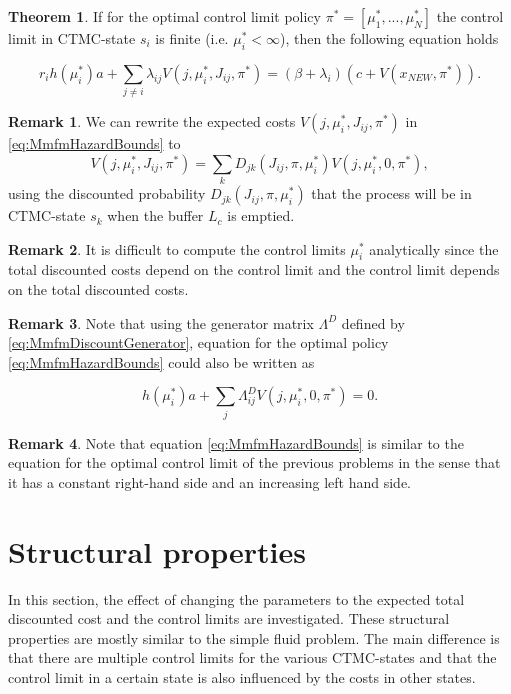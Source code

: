 \documentclass[a4paper]{thesis}
\theoremstyle{definition}
\newtheorem{remark}{Remark}[chapter]
\newtheorem{theorem}{Theorem}[chapter] %
\providecommand{\DIFaddbegin}{} %
\providecommand{\DIFaddend}{} %
\newcommand{\DIFaddincludegraphics}[2][]{{\color{blue}\fbox{\DIFOincludegraphics[#1]{#2}}}} %
\DeclareRobustCommand{\DIFaddbegin}{\DIFOaddbegin \let\includegraphics\DIFaddincludegraphics} %
\DeclareRobustCommand{\DIFaddend}{\DIFOaddend \let\includegraphics\DIFOincludegraphics} %
\begin{document}
	\begin{theorem}
		If for the optimal control limit policy $\pi^*=[\mu_1^*,...,\mu_N^*]$ the control limit in CTMC-state $s_i$ is finite (i.e. $\mu_i^*<\infty$), then the following equation holds 
		
		\begin{equation}\label{eq:MmfmHazardBounds}
		r_ih(\mu_i^*)a+\sum\limits_{j\neq i}\lambda_{ij} V(j,\mu_i^*,J_{ij},\pi^*)=
		(\beta+\lambda_i)(c+V(x_{NEW},\pi^*)).
		\end{equation}
	\end{theorem}
	\begin{remark}
		We can rewrite the expected costs $V(j,\mu_i^*,J_{ij},\pi^*)$ in \eqref{eq:MmfmHazardBounds} to
		\[
		V(j,\mu_i^*,J_{ij},\pi^*)=\sum\limits_k D_{jk}(J_{ij},\pi,\mu_i^*)V(j,\mu_i^*,0,\pi^*),
		\]
		using the discounted probability $D_{jk}(J_{ij},\pi,\mu_i^*)$ that the process will be in CTMC-state $s_k$ when the buffer $L_c$ is emptied.
	\end{remark}
	
	\begin{remark}
		It is difficult to compute the control limits $\mu_i^*$ analytically since the total discounted costs depend on the control limit and the control limit depends on the total discounted costs.
	\end{remark}
	
	\begin{remark}
		Note that using the generator matrix $\Lambda^D$ defined by \eqref{eq:MmfmDiscountGenerator}, equation for the optimal policy \eqref{eq:MmfmHazardBounds} could also be written as
		
		\begin{equation}\label{eq:MmfmHazardBoundsShort}
		h(\mu_i^*)a+\sum\limits_j\Lambda^D_{ij}V(j,\mu_i^*,0,\pi^*)=0.
		\end{equation}
	\end{remark}
	
	\begin{remark}
		Note that equation \eqref{eq:MmfmHazardBounds} is similar to the equation for the optimal control limit of the previous problems in the sense that it has a constant right-hand side and an increasing left hand side.
	\end{remark} \section{Structural properties}\DIFaddbegin \label{section:MmfmStructuralProperties}
	\DIFaddend In this section, the effect of changing the parameters to the expected total discounted cost and the control limits are investigated.
	These structural properties are mostly similar to the simple fluid problem.
	The main difference is that there are multiple control limits for the various CTMC-states and that the control limit in a certain state is also influenced by the costs in other states.
	
\end{document}

